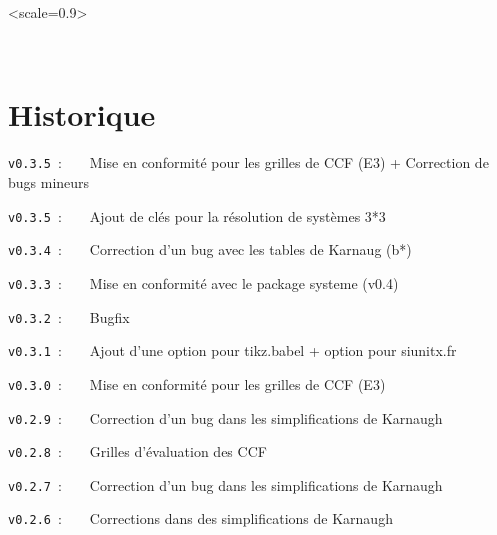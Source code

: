 \documentclass[french,a4paper,11pt]{article}
\providecommand\tikzlogo{Ti\textit{k}Z}
\providecommand\TeXLive{\TeX{}Live\xspace}
\let\TikZ\tikzlogo
\newcommand\TableauDocumentation{%
	\begin{tblr}{width=\linewidth,colspec={X[c]X[c]X[c]X[c]X[c]X[c]},cells={font=\large\sffamily}}
		{\LaTeX} & {\hologo{pdfLaTeX}} & {\hologo{LuaLaTeX}} & {\TikZ} & {\TeXLive} & {\hologo{MiKTeX}} \\
	\end{tblr}
}
\begin{document}
{{\vspace{0.5cm}

\hfill
\begin{GrapheTikz}[Unite=0.75cm,CouleurSommets={gray/blue},Epaisseur={very thick/thick},CouleurFleches=orange]<scale=0.9>
\end{GrapheTikz}
\hfill~
\hfill~


%
%
%
%
%

\newpage

\hypertarget{matoc}{}

\tableofcontents

\vfill

\newpage

\section{Historique}

\verb|v0.3.5|~:~~~~Mise en conformité pour les grilles de CCF (E3) + Correction de bugs mineurs

\verb|v0.3.5|~:~~~~Ajout de clés pour la résolution de systèmes 3*3

\verb|v0.3.4|~:~~~~Correction d'un bug avec les tables de Karnaug (b*)

\verb|v0.3.3|~:~~~~Mise en conformité avec le package \textsf{systeme (v0.4)}

\verb|v0.3.2|~:~~~~Bugfix

\verb|v0.3.1|~:~~~~Ajout d'une option pour \textsf{tikz.babel} + option pour \textsf{siunitx.fr}

\verb|v0.3.0|~:~~~~Mise en conformité pour les grilles de CCF (E3)

\verb|v0.2.9|~:~~~~Correction d'un bug dans les simplifications de Karnaugh

\verb|v0.2.8|~:~~~~Grilles d'évaluation des CCF

\verb|v0.2.7|~:~~~~Correction d'un bug dans les simplifications de Karnaugh

\verb|v0.2.6|~:~~~~Corrections dans des simplifications de Karnaugh

}}
\end{document}
